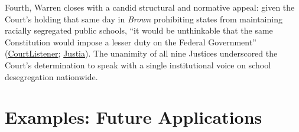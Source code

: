\documentclass[12pt]{article}
\begin{document}
Fourth, Warren closes with a candid structural and normative appeal: given the Court's holding that same day in \textit{Brown} prohibiting states from maintaining racially segregated public schools, ``it would be unthinkable that the same Constitution would impose a lesser duty on the Federal Government'' (\href{https://www.courtlistener.com/opinion/105222/bolling-v-sharpe/}{CourtListener}; \href{https://supreme.justia.com/cases/federal/us/347/497/}{Justia}). The unanimity of all nine Justices underscored the Court's determination to speak with a single institutional voice on school desegregation nationwide.

\section{Examples: Future Applications}
\end{document}
